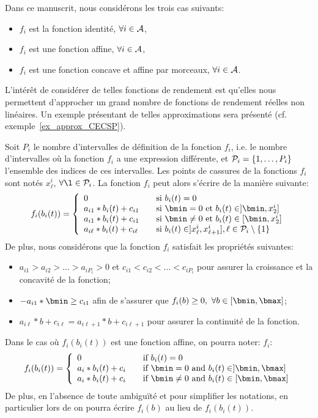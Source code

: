 Dans ce manuscrit, nous considérons les trois cas suivants:
\begin{itemize}
\item $f_i$ est la fonction identité, $\forall i \in \A$,
\item $f_i$ est une fonction affine, $\forall i \in \A$,
\item $f_i$ est une fonction concave et affine par morceaux, $\forall
  i \in \A$.
\end{itemize}

L'intérêt de considérer de telles fonctions de rendement est qu'elles
nous permettent d'approcher un grand nombre de fonctions de
rendement réelles non linéaires. Un exemple présentant de telles
approximations sera présenté (cf. exemple~\ref{ex_approx_CECSP}). 


Soit $P_i$ le nombre d'intervalles de définition de la fonction $f_i$,
i.e. le nombre d'intervalles où la fonction $f_i$ a une expression
différente, et $\P_i=\{1,\dots,P_i\}$ l'ensemble des indices de ces
intervalles. Les points de cassures de la fonctions $f_i$ sont notés
$x_\ell^i$, $\forall \l \in \P_i$. La fonction $f_i$ peut alors
s'écrire de la manière suivante: 
\[f_i(b_i(t))=\left\{
    \begin{array}{ll}
      0 & \quad \text{si }b_i(t)=0\\
      a_{i1}*b_i(t)+c_{i1} &\quad \text{si }\bmin=0\text{ et }b_i(t) \in ]\bmin,x_{2}^i] \\
      a_{i1}*b_i(t)+c_{i1} &\quad \text{si }\bmin\neq 0 \text{ et }b_i(t) \in
                            [\bmin,x_{2}^i] \\
      a_{i\ell}*b_i(t)+c_{i\ell} &\quad \text{si } b_i(t) \in
                                  ]x_{\ell}^i,x_{\ell+1}^i], \ell \in \P_i\setminus\{1\}
    \end{array}
  \right.\]
De plus, nous considérons que la fonction $f_i$ satisfait les
propriétés suivantes: 
\begin{itemize}
\item $a_{i1} >a_{i2} > \dots > a_{iP_i}>0$ et $c_{i1}
  <c_{i2} < \dots < c_{iP_i}$ pour assurer la croissance et la
  concavité de la fonction; 
\item $-a_{i1}*\bmin \ge c_{i1}$  afin de s'assurer que $f_i(b) \ge
  0,\ \forall b \in [\bmin,\bmax]$;
\item $a_{i\ell}*b+c_{i\ell}=a_{i\ell+1}*b+c_{i\ell+1}$
  pour assurer la continuité de la fonction.
\end{itemize}
Dans le cas où $f_i(b_i(t))$ est une fonction affine, on pourra noter:
$f_i$:
\[f_i(b_i(t))=\left\{
\begin{array}{ll}
  0 & \quad \text{if }b_i(t)=0\\
  a_i*b_i(t)+c_i &\quad \text{if }\bmin=0\text{ and }b_i(t) \in ]\bmin,\bmax] \\
  a_i*b_i(t)+c_i &\quad \text{if }\bmin\neq 0 \text{ and }b_i(t) \in [\bmin,\bmax]
\end{array}
\right.
\]
De plus, en l'absence de toute ambiguïté et pour simplifier les
notations, en particulier lors de on pourra écrire $f_i(b)$ au lieu de $f_i(b_i(t))$.

